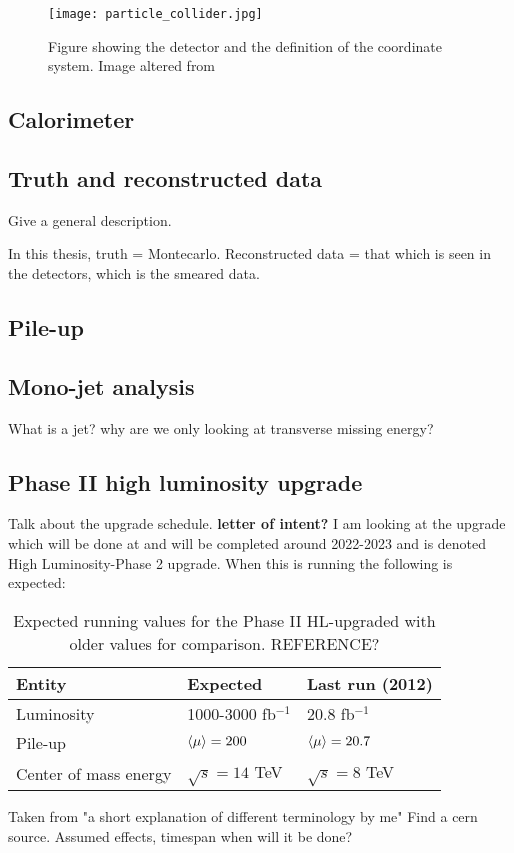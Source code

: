 \begin{figure}[ht]
\begin{center}
\texttt{[image: particle\_collider.jpg]}
\caption{Figure showing the \abbrATLAS detector and the definition of the coordinate system. Image altered from\citep{coordimage}}
\label{fig:coordinatesystem}
\end{center}
\end{figure}

\subsection{Calorimeter}
\subsection{Truth and reconstructed data}
Give a general description.

In this thesis, truth = Montecarlo. 
Reconstructed data = that which is seen in the detectors, which is the smeared data.
\subsection{Pile-up}\label{sec:experiment:subsec:pileup}
\subsection{Mono-jet analysis}\label{sec:experiment:subsec:monojet}
What is a jet? why are we only looking at transverse missing energy? 

\subsection{Phase II high luminosity upgrade}
Talk about the upgrade schedule. \textbf{letter of intent?}
I am looking at the upgrade which will be done at \abbrCERN and will be completed around 2022-2023 and is denoted High Luminosity-\abbrLHC Phase 2 upgrade. When this is running the following is expected:
\begin{table}[H]
\begin{center}
    \begin{tabular}{ | l | l | l |}
    \hline
    Entity & Expected & Last run (2012) \\ \hline
  	Luminosity & 1000-3000 fb$^{-1}$ & 20.8 fb$^{-1}$ \\ \hline
  	Pile-up & $\left<\mu\right>=200$ & $\left<\mu\right>=20.7$ \\ \hline
  	Center of mass energy & $\sqrt{s}=14$ TeV &  $\sqrt{s}=8$ TeV \\ \hline
  	\end{tabular}
  	
  	\caption{Expected running values for the Phase II HL-upgraded \abbrLHC with older values for comparison. REFERENCE?}
  	\label{tab:expectvalues}
  	\end{center}
    \end{table}
Taken from "a short explanation of different terminology by me" Find a cern source.
Assumed effects, timespan when will it be done?

